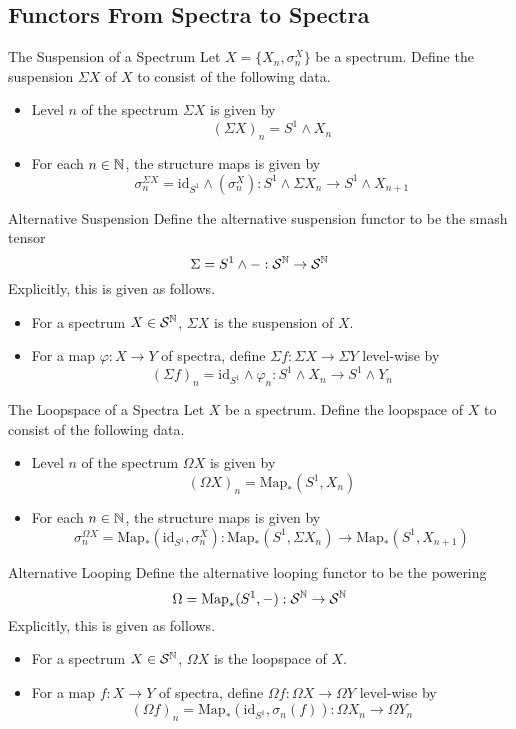 \documentclass[a4paper]{article}
\begin{document}
\subsection{Functors From Spectra to Spectra}
\begin{defn}{The Suspension of a Spectrum}{} Let $X=\{X_n,\sigma_n^X\}$ be a spectrum. Define the suspension $\Sigma X$ of $X$ to consist of the following data. 
\begin{itemize}
\item Level $n$ of the spectrum $\Sigma X$ is given by $$(\Sigma X)_n=S^1\wedge X_n$$
\item For each $n\in\mathbb{N}$, the structure maps is given by $$\sigma_n^{\Sigma X}=\text{id}_{S^1}\wedge(\sigma_n^X):S^1\wedge\Sigma X_n\to S^1\wedge X_{n+1}$$
\end{itemize}
\end{defn}

\begin{defn}{Alternative Suspension}{} Define the alternative suspension functor to be the smash tensor $$\Sigma=S^1\wedge -:\mathcal{S}^{\mathbb{N}}\to\mathcal{S}^{\mathbb{N}}$$ Explicitly, this is given as follows. 
\begin{itemize}
\item For a spectrum $X\in\mathcal{S}^{\mathbb{N}}$, $\Sigma X$ is the suspension of $X$. 
\item For a map $\varphi:X\to Y$ of spectra, define $\Sigma f:\Sigma X\to\Sigma Y$ level-wise by $$(\Sigma f)_n=\text{id}_{S^1}\wedge\varphi_n:S^1\wedge X_n\to S^1\wedge Y_n$$
\end{itemize}
\end{defn}

\begin{defn}{The Loopspace of a Spectra}{} Let $X$ be a spectrum. Define the loopspace of $X$ to consist of the following data.
\begin{itemize}
\item Level $n$ of the spectrum $\Omega X$ is given by $$(\Omega X)_n=\text{Map}_\ast(S^1,X_n)$$
\item For each $n\in\mathbb{N}$, the structure maps is given by $$\sigma_n^{\Omega X}=\text{Map}_\ast(\text{id}_{S^1},\sigma_n^X):\text{Map}_\ast(S^1,\Sigma X_n)\to\text{Map}_\ast(S^1,X_{n+1})$$
\end{itemize}
\end{defn}

\begin{defn}{Alternative Looping}{} Define the alternative looping functor to be the powering $$\Omega=\text{Map}_\ast(S^1,-):\mathcal{S}^{\mathbb{N}}\to\mathcal{S}^{\mathbb{N}}$$ Explicitly, this is given as follows. 
\begin{itemize}
\item For a spectrum $X\in\mathcal{S}^{\mathbb{N}}$, $\Omega X$ is the loopspace of $X$. 
\item For a map $f:X\to Y$ of spectra, define $\Omega f:\Omega X\to\Omega Y$ level-wise by $$(\Omega f)_n=\text{Map}_\ast(\text{id}_{S^1},\sigma_n(f)):\Omega X_n\to\Omega Y_n$$
\end{itemize}
\end{defn}
\end{document}
